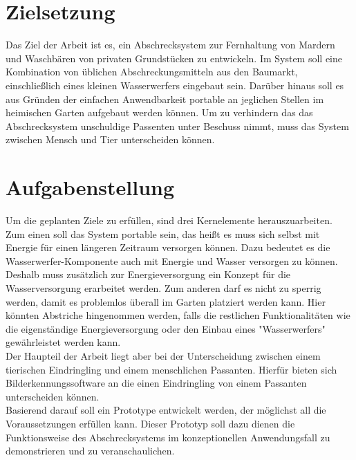 \section{Zielsetzung}

Das Ziel der Arbeit ist es, ein Abschrecksystem zur Fernhaltung von Mardern und Waschbären von privaten Grundstücken zu entwickeln. Im System soll eine Kombination von üblichen Abschreckungsmitteln aus den Baumarkt, einschließlich eines kleinen Wasserwerfers eingebaut sein. Darüber hinaus soll es aus Gründen der einfachen Anwendbarkeit portable an jeglichen Stellen im heimischen Garten aufgebaut werden können. Um zu verhindern das das Abschrecksystem unschuldige Passenten unter Beschuss nimmt, muss das System zwischen Mensch und Tier unterscheiden können.

\section{Aufgabenstellung}

Um die geplanten Ziele zu erfüllen, sind drei Kernelemente herauszuarbeiten. Zum einen soll das System portable sein, das heißt es muss sich selbst mit Energie für einen längeren Zeitraum versorgen können. Dazu bedeutet es die Wasserwerfer-Komponente auch mit Energie und Wasser versorgen zu können. Deshalb muss zusätzlich zur Energieversorgung ein Konzept für die Wasserversorgung erarbeitet werden. Zum anderen darf es nicht zu sperrig werden, damit es problemlos überall im Garten platziert werden kann. Hier könnten Abstriche hingenommen werden, falls die restlichen Funktionalitäten wie die eigenständige Energieversorgung oder den Einbau eines "Wasserwerfers" gewährleistet werden kann.
\\
Der Haupteil der Arbeit liegt aber bei der Unterscheidung zwischen einem tierischen Eindringling und einem menschlichen Passanten. Hierfür bieten sich Bilderkennungssoftware an die einen Eindringling von einem Passanten unterscheiden können.\\
Basierend darauf soll ein Prototype entwickelt werden, der möglichst all die Voraussetzungen erfüllen kann. Dieser Prototyp soll dazu dienen die Funktionsweise des Abschrecksystems im konzeptionellen Anwendungsfall zu demonstrieren und zu veranschaulichen.

